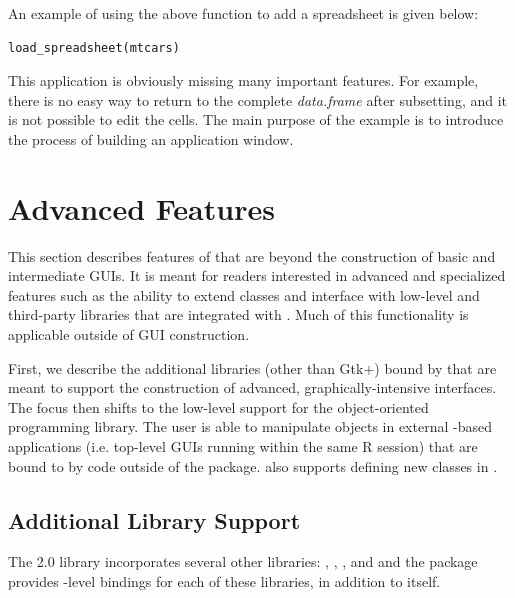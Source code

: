\documentclass[article]{jss}
\begin{document}
An example of using the above function to add a spreadsheet is given
below:
\begin{verbatim}
load_spreadsheet(mtcars)
\end{verbatim}

This application is obviously missing many important features. For
example, 
there is no easy way to return to the complete \emph{data.frame} after
subsetting, and
it is not possible to edit the cells. The main purpose of the example
is to
introduce the process of building an application window.

\section{Advanced Features}

This section describes features of  that are beyond the
construction of basic and intermediate GUIs. It is meant for readers
interested in advanced and specialized  features such as
the ability to extend  classes and interface with low-level
and third-party libraries that are integrated with . Much of this functionality is applicable outside of GUI construction.


First, we describe the additional libraries (other than Gtk+) bound by
 that are meant to support the construction of advanced,
graphically-intensive interfaces. The focus then shifts to the
low-level support for the  object-oriented programming
library. The  user is able to manipulate objects in
external -based applications (i.e. top-level GUIs running
within the same R session) that are bound to  by code
outside of the  package.  also supports defining
new  classes in .

\subsection{Additional Library Support}

The  2.0 library incorporates several other libraries:
, , ,  and 
and the  package provides -level bindings for
each of these libraries, in addition to  itself.
\end{document}
